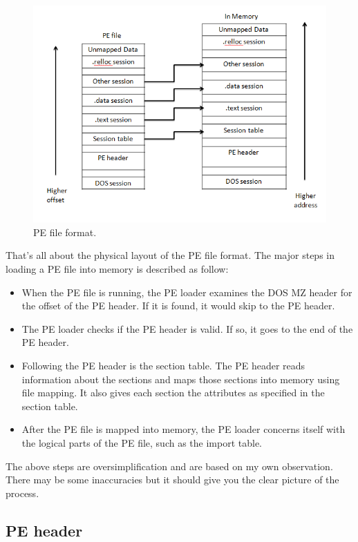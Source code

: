 \begin{figure}[h!]
\centering
\includegraphics[width=1\textwidth]{graph/pe1.png}
\caption{PE file format.}
\label{fig:pe1}
\end{figure}
That's all about the physical layout of the PE file format. The major steps in loading a PE file into memory is described as follow:

\begin{itemize}
\item When the PE file is running, the PE loader examines the DOS MZ header for the offset of the PE header. If it is found, it would skip to the PE header.
\item The PE loader checks if the PE header is valid. If so, it goes to the end of the PE header.
\item Following the PE header is the section table. The PE header reads information about the sections and maps those sections into memory using file mapping. It also gives each section the attributes as specified in the section table.
\item After the PE file is mapped into memory, the PE loader concerns itself with the logical parts of the PE file, such as the import table.
\end{itemize}

The above steps are oversimplification and are based on my own observation. There may be some inaccuracies but it should give you the clear picture of the process.
\subsection{PE header}

